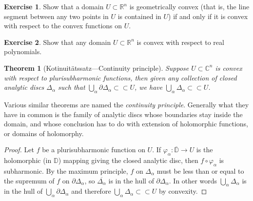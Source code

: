 \documentclass[12pt,openany]{book}
\newcommand{\C}{{\mathbb{C}}}
\newcommand{\R}{{\mathbb{R}}}
\newcommand{\D}{{\mathbb{D}}}
\theoremstyle{plain}
\newtheorem{thm}{Theorem}[section]
\theoremstyle{remark}
\theoremstyle{definition}
\newenvironment{exbox}{%
    \def\FrameCommand{\vrule width 1pt \relax\hspace {10pt}}%
    \MakeFramed {\advance \hsize -\width \FrameRestore }%
}{%
    \endMakeFramed
}
\theoremstyle{exercise}
\newtheorem{exercise}{Exercise}[section]
\theoremstyle{example}
\begin{document}
\begin{exbox}
\begin{exercise}
Show that a domain $U \subset \R^n$
is geometrically convex (that is, the line segment
between any two points in $U$ is contained in $U$) if and only if it is
convex with respect to the convex functions on $U$.
\end{exercise}

\begin{exercise}
Show that any domain $U \subset \R^n$ is convex with respect to real
polynomials.
\end{exercise}
%
\end{exbox}

\begin{thm}[Kotinuit\"atssatz---Continuity
principle]
Suppose $U \subset \C^n$ is convex with respect to plurisubharmonic
functions,
then given any collection of closed analytic discs $\Delta_\alpha$
such that $\bigcup_\alpha \partial \Delta_\alpha \subset \subset U$,
we have
$\bigcup_\alpha \Delta_\alpha \subset \subset U$.
\end{thm}

Various similar theorems are named the \emph{continuity principle}.
Generally what they have in common is the family of analytic discs whose
boundaries stay inside the domain, and whose conclusion has to do
with extension of holomorphic functions, or domains of holomorphy.

\begin{proof}
Let $f$ be a plurisubharmonic function on $U$.  If $\varphi_\alpha \colon
\overline{\D} \to U$ is the holomorphic (in $\D$) mapping giving the closed
analytic disc, then $f \circ \varphi_\alpha$ is subharmonic.
By the maximum principle,
$f$ on $\Delta_\alpha$ must be less than or equal to the supremum
of $f$ on $\partial \Delta_\alpha$, so $\overline{\Delta_\alpha}$
is in the hull of 
$\partial \Delta_\alpha$.
In other words
$\bigcup_\alpha \Delta_\alpha$ is in the hull of
$\bigcup_\alpha \partial \Delta_\alpha$ and therefore 
$\bigcup_\alpha \Delta_\alpha \subset \subset U$ by convexity.
\end{proof}
\end{document}
